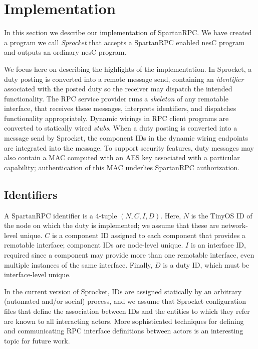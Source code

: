 \section{Implementation}
\label{section-implementation}

In this section we describe our implementation of SpartanRPC. We have created a program we call
\emph{Sprocket} \cite{sprocket} that accepts a SpartanRPC enabled nesC program and outputs an
ordinary nesC program.

We focus here on describing the highlights of the implementation. In Sprocket, a duty posting is
converted into a remote message send, containing an \emph{identifier} associated with the posted
duty so the receiver may dispatch the intended functionality. The RPC service provider runs a
\emph{skeleton} of any remotable interface, that receives these messages, interprets
identifiers, and dispatches functionality appropriately. Dynamic wirings in RPC client programs
are converted to statically wired \emph{stubs}. When a duty posting is converted into a message
send by Sprocket, the component IDs in the dynamic wiring endpoints are integrated into the
message. To support security features, duty messages may also contain a MAC computed with an AES
key associated with a particular capability; authentication of this MAC underlies SpartanRPC
authorization.

\subsection{Identifiers}

A SpartanRPC identifier is a 4-tuple $(N, C, I, D)$. Here, $N$ is the TinyOS ID of the node on
which the duty is implemented; we assume that these are network-level unique. $C$ is a component
ID assigned to each component that provides a remotable interface; component IDs are node-level
unique. $I$ is an interface ID, required since a component may provide more than one remotable
interface, even multiple instances of the same interface. Finally, $D$ is a duty ID, which must
be interface-level unique.

In the current version of Sprocket, IDs are assigned statically by an arbitrary (automated
and/or social) process, and we assume that Sprocket configuration files that define the
association between IDs and the entities to which they refer are known to all interacting
actors. More sophisticated techniques for defining and communicating RPC interface definitions
between actors is an interesting topic for future work.


